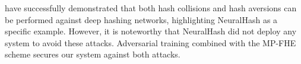 \citet{struppek2022learning, bhatia2022exploitingdefendingapproximatelinearity} have successfully demonstrated that both hash collisions and hash aversions can be performed against deep hashing networks, highlighting NeuralHash as a specific example. However, it is noteworthy that NeuralHash did not deploy any system to avoid these attacks. Adversarial training combined with the MP-FHE scheme secures our system against both attacks.



